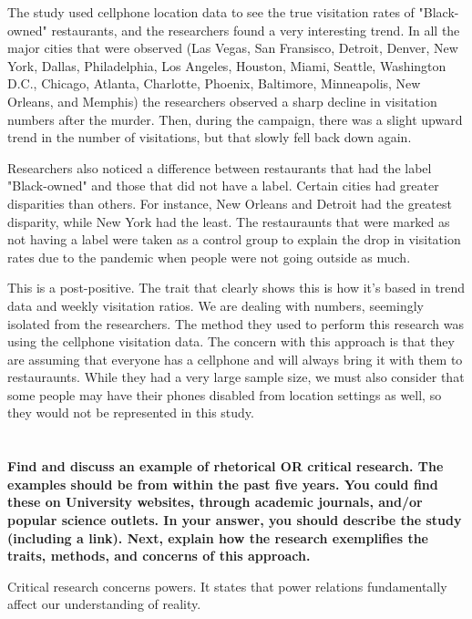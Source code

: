 \documentclass[a4paper]{article}
\begin{document}
        The study used cellphone location data to see the true visitation rates of "Black-owned" restaurants, and the researchers found 
        a very interesting trend. In all the major cities that were observed (Las Vegas, San Fransisco, Detroit, Denver, New York, Dallas, 
        Philadelphia, Los Angeles, Houston, Miami, Seattle, Washington D.C., Chicago, Atlanta, Charlotte, Phoenix, Baltimore, Minneapolis, 
        New Orleans, and Memphis) the researchers observed a sharp decline in visitation numbers after the murder. Then, during the campaign, 
        there was a slight upward trend in the number of visitations, but that slowly fell back down again. 

        Researchers also noticed a difference between restaurants that had the label "Black-owned" and those that did not have a label. 
        Certain cities had greater disparities than others. For instance, New Orleans and Detroit had the greatest disparity, while New York
        had the least. The restauraunts that were marked as not having a label were taken as a control group to explain the drop in 
        visitation rates due to the pandemic when people were not going outside as much. 

        This is a post-positive. The trait that clearly shows this is how it's based in trend data and weekly visitation ratios. We are 
        dealing with numbers, seemingly isolated from the researchers. The method they used to perform this research was using the cellphone 
        visitation data. The concern with this approach is that they are assuming that everyone has a cellphone and will always bring it with them 
        to restauraunts. While they had a very large sample size, we must also consider that some people may have their phones disabled from location 
        settings as well, so they would not be represented in this study. 

    \section{}
        \textbf{Find and discuss an example of rhetorical OR critical research. The examples should be from within the past five years. You could find these on University websites, through academic journals, and/or popular science outlets. In your answer, you should describe the study (including a link). Next, explain how the research exemplifies the traits, methods, and concerns of this approach.}
        
        Critical research concerns powers. It states that power relations fundamentally 
        affect our understanding of reality. 
\end{document}
